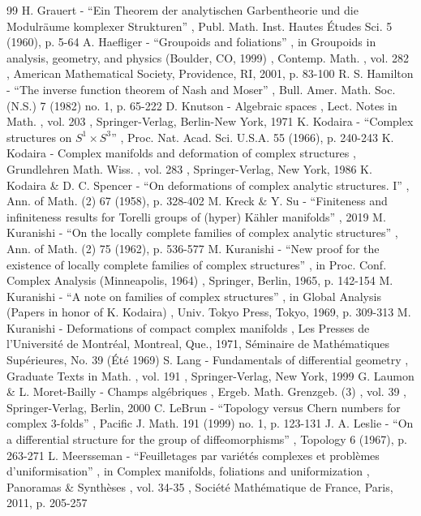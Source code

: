 \begin{thebibliography}{99}
 H. Grauert - “Ein Theorem der analytischen Garbentheorie und die Modulräume komplexer Strukturen” , Publ. Math. Inst. Hautes Études Sci. 5 (1960), p. 5-64
 A. Haefliger - “Groupoids and foliations” , in Groupoids in analysis, geometry, and physics (Boulder, CO, 1999) , Contemp. Math. , vol. 282 , American Mathematical Society, Providence, RI, 2001, p. 83-100
 R. S. Hamilton - “The inverse function theorem of Nash and Moser” , Bull. Amer. Math. Soc. (N.S.) 7 (1982) no. 1, p. 65-222
 D. Knutson - Algebraic spaces , Lect. Notes in Math. , vol. 203 , Springer-Verlag, Berlin-New York, 1971
 K. Kodaira - “Complex structures on $S^{1}\times S^{3}$” , Proc. Nat. Acad. Sci. U.S.A. 55 (1966), p. 240-243
 K. Kodaira - Complex manifolds and deformation of complex structures , Grundlehren Math. Wiss. , vol. 283 , Springer-Verlag, New York, 1986
 K. Kodaira \& D. C. Spencer - “On deformations of complex analytic structures. I” , Ann. of Math. (2) 67 (1958), p. 328-402
 M. Kreck \& Y. Su - “Finiteness and infiniteness results for Torelli groups of (hyper) Kähler manifolds” , 2019
 M. Kuranishi - “On the locally complete families of complex analytic structures” , Ann. of Math. (2) 75 (1962), p. 536-577
 M. Kuranishi - “New proof for the existence of locally complete families of complex structures” , in Proc. Conf. Complex Analysis (Minneapolis, 1964) , Springer, Berlin, 1965, p. 142-154
 M. Kuranishi - “A note on families of complex structures” , in Global Analysis (Papers in honor of K. Kodaira) , Univ. Tokyo Press, Tokyo, 1969, p. 309-313
 M. Kuranishi - Deformations of compact complex manifolds , Les Presses de l’Université de Montréal, Montreal, Que., 1971, Séminaire de Mathématiques Supérieures, No. 39 (Été 1969)
 S. Lang - Fundamentals of differential geometry , Graduate Texts in Math. , vol. 191 , Springer-Verlag, New York, 1999
 G. Laumon \& L. Moret-Bailly - Champs algébriques , Ergeb. Math. Grenzgeb. (3) , vol. 39 , Springer-Verlag, Berlin, 2000
 C. LeBrun - “Topology versus Chern numbers for complex $3$-folds” , Pacific J. Math. 191 (1999) no. 1, p. 123-131
 J. A. Leslie - “On a differential structure for the group of diffeomorphisms” , Topology 6 (1967), p. 263-271
 L. Meersseman - “Feuilletages par variétés complexes et problèmes d’uniformisation” , in Complex manifolds, foliations and uniformization , Panoramas \& Synthèses , vol. 34-35 , Société Mathématique de France, Paris, 2011, p. 205-257

\end{thebibliography}
